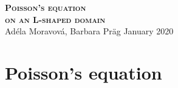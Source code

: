 \documentclass[pagesize]{scrartcl}
\begin{document}
    \begin{center}
	\textsc{ \bfseries{\huge
			Poisson's equation\\ on an L-shaped domain}}
\\ 
	\vspace{2mm} Adéla Moravová, Barbara Präg  January 2020

\end{center}






\section{Poisson's equation}
\end{document}
